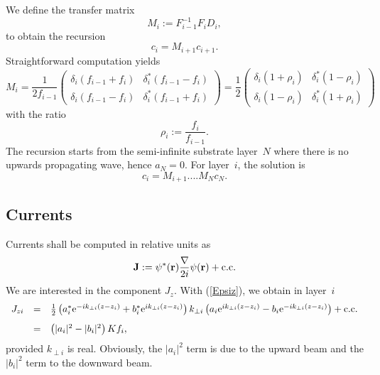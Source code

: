 We define the transfer matrix
\begin{equation}\label{Edef_M}
  M_i
  := F_{i-1}^{-1}F_i D_i,
\end{equation}
to obtain the recursion 
\begin{equation}\label{EcMc}
  c_i = M_{i+1} c_{i+1}.
\end{equation}
Straightforward computation yields
\begin{equation}
  M_i
   = \frac{1}{2f_{i-1}}
   \left(\begin{array}{cc}
       \delta_i(f_{i-1}+f_{i})&\delta_i^*(f_{i-1}-f_{i})\\
       \delta_i(f_{i-1}-f_{i})&\delta_i^*(f_{i-1}+f_{i})
   \end{array}\right)
   = \frac{1}{2}
   \left(\begin{array}{cc}
       \delta_i(1+\rho_{i})&\delta_i^*(1-\rho_{i})\\
       \delta_i(1-\rho_{i})&\delta_i^*(1+\rho_{i})
   \end{array}\right)
\end{equation}
with the ratio
\begin{equation}
  \rho_i := \frac{f_{i}}{f_{i-1}}.
\end{equation}
The recursion starts from the semi-infinite substrate layer~$N$
where there is no upwards propagating wave, hence $a_N=0$.
For layer~$i$, the solution is
\begin{equation}\label{Eci}
  c_i
  =
  M_{i+1}.... M_{N} c_N.  %
\end{equation}

\subsection{Currents}

Currents shall be computed in relative units as
\begin{equation}
  \mathbf{J}:=\psi^*(\mathbf{r})\frac{\mathbf{\nabla}}{2i}\psi(\mathbf{r})+\text{c.c.}
\end{equation}
We are interested in the component $J_z$.
With (\ref{Epsiz}),
we obtain in layer~$i$
\begin{equation}\label{EJperp}
  \begin{array}{lcl}
  J_{zi} &=& \frac{1}{2}
  \left( a_i^*\text{e}^{-ik_{\perp i}(z-z_i)} + b_i^*\text{e}^{ik_{\perp i}(z-z_i)} \right)
  k_{\perp i}
  \left( a_i\text{e}^{ik_{\perp i}(z-z_i)} - b_i\text{e}^{-ik_{\perp i}(z-z_i)} \right)
  +\text{c.c.}\\[2ex]
  &=& \left( |a_i|^2 - |b_i|^2 \right) K f_i,
  \end{array}
\end{equation}
provided $k_{\perp i}$ is real.
Obviously,
the $|a_i|^2$ term is due to the upward beam
and the $|b_i|^2$ term to the downward beam.

